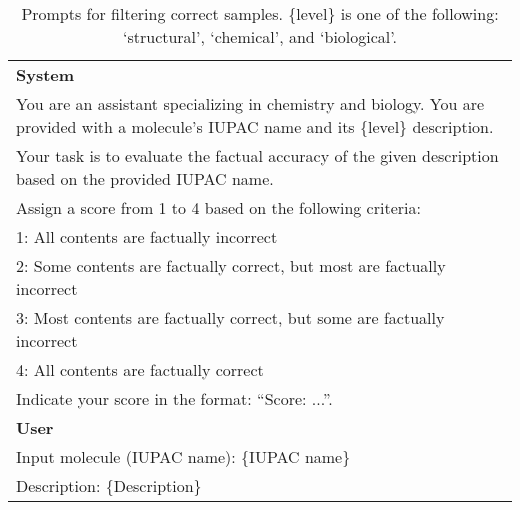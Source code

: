 \begin{table*}[ht!]
\centering  
\footnotesize
\begin{tcolorbox}[enhanced,breakable,
    colframe=gray!50!white,
    colbacktitle=white,
    coltitle=black,
    colback=white,
    borderline={0.5mm}{0mm}{gray!15!white},
    borderline={0.5mm}{0mm}{gray!50!white,dashed},
    attach boxed title to top center={yshift=-2mm},
    boxed title style={boxrule=0.8pt},
    title=\normalsize\textbf{Prompt for Filtering Correct Responses}]
    \renewcommand{\arraystretch}{1.3}
    \begin{tabular}{p{.95\linewidth}}
        \textbf{System}\\
        You are an assistant specializing in chemistry and biology. You are provided with a molecule's IUPAC name and its \{level\} description.\\
        Your task is to evaluate the factual accuracy of the given description based on the provided IUPAC name. \\
        Assign a score from 1 to 4 based on the following criteria: \\
        1: All contents are factually incorrect \\
        2: Some contents are factually correct, but most are factually incorrect \\
        3: Most contents are factually correct, but some are factually incorrect \\
        4: All contents are factually correct \\
        Indicate your score in the format: ``Score: ...''.\\
        \midrule
        \textbf{User}\\
        Input molecule (IUPAC name): \{IUPAC name\} \\
        Description: \{Description\}
    \end{tabular}
\end{tcolorbox}
\caption{Prompts for filtering correct samples. \{level\} is one of the following: `structural', `chemical', and `biological'.}
\label{app:tab:prompts_filtering}
\end{table*}

